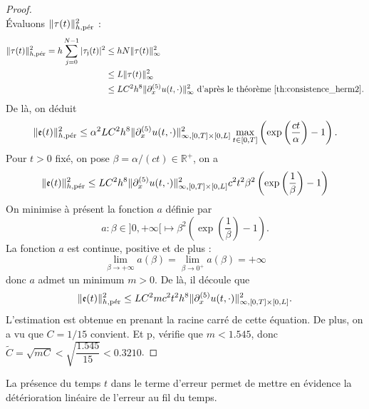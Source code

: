 \begin{proof}
\begin{equation}
\end{equation}
Évaluons $\| \tau(t) \|_{h,\per}^2$ :
\begin{align*}
\|\mathfrak{\tau}(t)\|_{h,\per}^2 = h \gsum_{j=0}^{N-1} |\mathfrak{\tau_j}(t)|^2 & \leq h N \|\mathfrak{\tau}(t)\|_{\infty}^2 \\
	& \leq  L \|\mathfrak{\tau}(t)\|_{\infty}^2 \\
	& \leq L C^2 h^8  \| \partial_x^{(5)} u(t,\cdot) \|_{\infty}^2 \text{ d'après le théorème \ref{th:consistence_herm2}.}
\end{align*}
De là, on déduit
\begin{equation}
\|\mathfrak{e}(t)\|_{h,\per}^2 \leq \alpha^2 L C^2 h^8  \| \partial_x^{(5)} u(t,\cdot) \|_{\infty,[0,T] \times [0,L]}^2 \max_{t \in [0,T]} \left( \exp \left( \dfrac{ct}{\alpha} \right) -1  \right).
\end{equation}
Pour $t>0$ fixé, on pose $\beta = \alpha/(ct) \in \mathbb{R}^+$, on a 
\begin{equation}
\|\mathfrak{e}(t)\|_{h,\per}^2 \leq L C^2 h^8  \| \partial_x^{(5)} u(t,\cdot) \|_{\infty,[0,T] \times [0,L]}^2 c^2 t^2 \beta^2 \left( \exp \left( \dfrac{1}{\beta} \right) -1  \right)
\end{equation}
On minimise à présent la fonction $a$ définie par
\begin{equation}
a :\beta \in ]0 , + \infty[ \mapsto \beta^2 \left( \exp \left( \dfrac{1}{\beta} \right) -1  \right).
\end{equation}
La fonction $a$ est continue, positive et de plus :
\begin{equation}
\lim_{\beta \rightarrow + \infty} a(\beta) = \lim_{\beta \rightarrow 0^+} a(\beta) = + \infty
\end{equation}
donc $a$ admet un minimum $m>0$. De là, il découle que
\begin{equation*}
\|\mathfrak{e}(t)\|_{h,\per}^2 \leq L C^2 m c^2 t^2 h^8  \| \partial_x^{(5)} u(t,\cdot) \|_{\infty,[0,T] \times [0,L]}^2.
\end{equation*}
L'estimation est obtenue en prenant la racine carré de cette équation. De plus, on a vu que $C = 1/15$ convient. Et p, vérifie que $m<1.545$, donc $\tilde{C} = \sqrt{mC} < \sqrt{\dfrac{1.545}{15}} < 0.3210$.
\end{proof}

La présence du temps $t$ dans le terme d'erreur permet de mettre en évidence la détérioration linéaire de l'erreur au fil du temps. 

